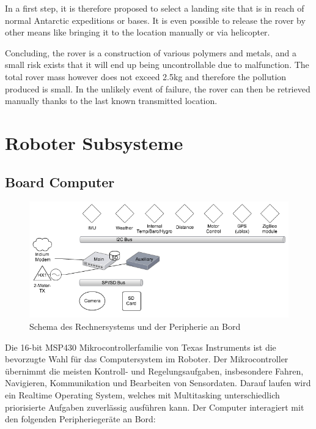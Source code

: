 \documentclass[a4paper,12pt]{article}
\begin{document}
In a first step, it is therefore proposed to select a landing site that is in reach of normal Antarctic expeditions or bases. It is even possible to release the rover by other means like bringing it to the location manually or via helicopter.

Concluding, the rover is a construction of various polymers and metals, and a small risk exists that it will end up being uncontrollable due to malfunction. The total rover mass however does not exceed 2.5kg and therefore the pollution produced is small. In the unlikely event of failure, the rover can then be retrieved manually thanks to the last known transmitted location.




\section{Roboter Subsysteme}

\subsection{Board Computer}
\begin{figure}[h!]
	\centering
    \includegraphics[width=1\textwidth]{schema}
    \caption{Schema des Rechnersystems und der Peripherie an Bord}
\end{figure} 

Die 16-bit MSP430 Mikrocontrollerfamilie von Texas Instruments ist die bevorzugte Wahl für das Computersystem im Roboter. Der Mikrocontroller übernimmt die meisten Kontroll- und Regelungsaufgaben, insbesondere Fahren, Navigieren, Kommunikation und Bearbeiten von Sensordaten. Darauf laufen wird ein Realtime Operating System, welches mit Multitasking unterschiedlich priorisierte Aufgaben zuverlässig ausführen kann. Der Computer interagiert mit den folgenden Peripheriegeräte an Bord:
\end{document}
